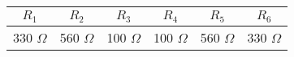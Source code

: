 \begin{tabular}{ | c | c | c | c | c | c | }
	\hline
	$R_1$ & $R_2$ & $R_3$ & $R_4$ & $R_5$ & $R_6$ \\
	\hline
	330 $\Omega$ & 560 $\Omega$ & 100 $\Omega$ & 100 $\Omega$ & 560 $\Omega$ & 330 $\Omega$ \\
	\hline
\end{tabular}